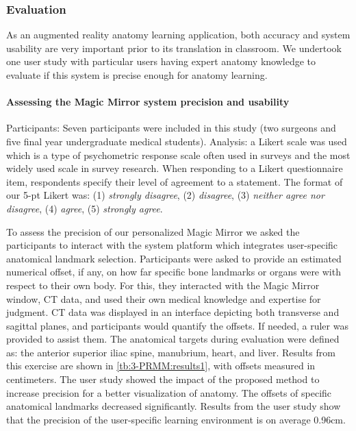 \subsubsection{Evaluation}
As an augmented reality anatomy learning application, both accuracy and system usability are very important prior to its translation in classroom. We undertook one user study with particular users having expert anatomy knowledge to evaluate if this system is precise enough for anatomy learning.%

\paragraph{Assessing the Magic Mirror system precision and usability}
Participants: Seven participants were included in this study (two surgeons and five final year undergraduate medical students). 
Analysis: a Likert scale was used which is a type of psychometric response scale often used in surveys and the most widely used scale in survey research. When responding to a Likert questionnaire item, respondents specify their level of agreement to a statement. The format of our 5-pt Likert was: (1) \textit{strongly disagree}, (2) \textit{disagree}, (3) \textit{neither agree nor disagree}, (4) \textit{agree}, (5) \textit{strongly agree}. 

To assess the precision of our personalized Magic Mirror we asked the participants to interact with the system platform which integrates user-specific anatomical landmark selection. Participants were asked to provide an estimated numerical offset, if any, on how far specific bone landmarks or organs were with respect to their own body. For this, they interacted with the Magic Mirror window, CT data, and used their own medical knowledge and expertise for judgment. CT data was displayed in an interface depicting both transverse and sagittal planes, and participants would quantify the offsets. If needed, a ruler was provided to assist them. The anatomical targets during evaluation were defined as: the anterior superior iliac spine, manubrium, heart, and liver. 
Results from this exercise are shown in \tablename{\ref{tb:3-PRMM:results1}}, with offsets measured in centimeters.  The user study showed the impact of the proposed method to increase precision for a better visualization of anatomy. The offsets of specific anatomical landmarks decreased significantly. Results from the user study show that the precision of the user-specific learning environment is on average 0.96cm.


